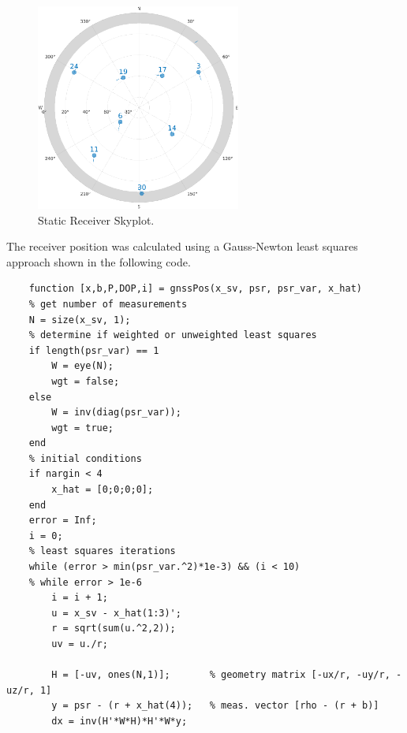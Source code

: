 \documentclass[11pt]{article}
\begin{document}
\begin{enumerate}[label=\textbf{\arabic*.}]
\begin{figure}[H]
    \centering
    \includegraphics[width=0.6\textwidth]{static_skyplot.png}
    \caption{Static Receiver Skyplot.}
  \end{figure}
  The receiver position was calculated using a Gauss-Newton least squares 
  approach shown in the following code.
  \begin{lstlisting}
    function [x,b,P,DOP,i] = gnssPos(x_sv, psr, psr_var, x_hat)
    % get number of measurements
    N = size(x_sv, 1);
    % determine if weighted or unweighted least squares
    if length(psr_var) == 1
        W = eye(N);
        wgt = false;
    else
        W = inv(diag(psr_var));
        wgt = true;
    end
    % initial conditions
    if nargin < 4
        x_hat = [0;0;0;0];
    end
    error = Inf;
    i = 0;
    % least squares iterations
    while (error > min(psr_var.^2)*1e-3) && (i < 10)
    % while error > 1e-6
        i = i + 1;
        u = x_sv - x_hat(1:3)';
        r = sqrt(sum(u.^2,2));
        uv = u./r;
    
        H = [-uv, ones(N,1)];       % geometry matrix [-ux/r, -uy/r, -uz/r, 1]
        y = psr - (r + x_hat(4));   % meas. vector [rho - (r + b)]
        dx = inv(H'*W*H)*H'*W*y;
    

\end{lstlisting}
\end{enumerate}
\end{document}
